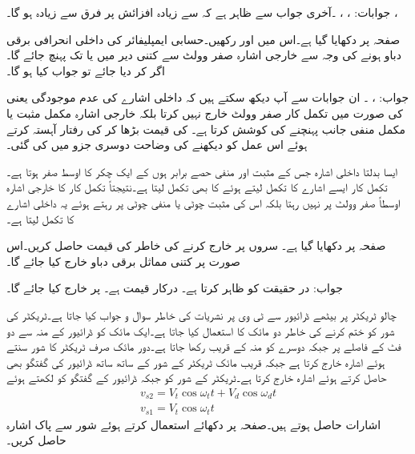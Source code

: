 جوابات: ،  ، ۔آخری جواب سے ظاہر ہے کہ  سے زیادہ افزائش پر فرق  سے زیادہ ہو گا۔ ، 

صفحہ  پر  دکھایا گیا ہے۔اس میں  اور  رکھیں۔حسابی ایمپلیفائر کی داخلی انحرافی برقی دباو  ہونے کی وجہ سے خارجی اشارہ صفر وولٹ سے کتنی دیر میں  یا  تک پہنچ جائے گا۔اگر   کر دیا جائے تو جواب کیا ہو گا۔

جواب: ،  ۔ ان جوابات سے آپ دیکھ سکتے ہیں کہ داخلی اشارے کی عدم موجودگی یعنی   کی صورت میں تکمل کار صفر وولٹ خارج نہیں کرتا بلکہ خارجی اشارہ مکمل مثبت یا مکمل منفی جانب پہنچنے کی کوشش کرتا ہے۔ کی قیمت بڑھا کر   کی رفتار آہستہ کرتے ہوئے اس عمل کو دیکھنے کی وضاحت دوسری جزو میں کی گئی۔

ایسا بدلتا داخلی اشارہ جس کے مثبت اور منفی حصے  برابر ہوں کے ایک چکر کا اوسط صفر ہوتا ہے۔تکمل کار ایسے اشارے کا تکمل لیتے ہوئے  کا بھی تکمل لیتا ہے۔نتیجتاً تکمل کار کا خارجی اشارہ اوسطاً صفر وولٹ پر نہیں رہتا بلکہ اس کی مثبت چوٹی  یا منفی چوٹی  پر رہتے ہوئے یہ داخلی اشارے کا تکمل لیتا ہے۔

صفحہ  پر  دکھایا گیا ہے۔ سروں  پر  خارج کرنے کی خاطر  کی قیمت حاصل کریں۔اس صورت   پر کتنی مماثل برقی دباو خارج کیا جائے گا۔

جواب: در حقیقت  کو ظاہر کرتا ہے۔  درکار قیمت ہے۔ پر  خارج کیا جائے گا۔

 
چالو ٹریکٹر پر بیٹھے ڈرائیور سے  ٹی وی پر نشریات کی خاطر سوال و جواب کیا جاتا ہے۔ٹریکٹر کی شور کو ختم کرنے کی خاطر دو مائک کا استعمال کیا جاتا ہے۔ایک مائک کو ڈرائیور کے منہ سے دو فٹ کے فاصلے پر جبکہ دوسرے کو منہ کے قریب رکھا جاتا ہے۔دور مائک صرف ٹریکٹر کا شور سنتے ہوئے  اشارہ خارج کرتا ہے جبکہ قریب مائک ٹریکٹر کے شور کے ساتھ ساتھ ڈرائیور کی گفتگو بھی حاصل کرتے ہوئے اشارہ  خارج کرتا ہے۔ٹریکٹر کے شور کو  جبکہ ڈرائیور کے گفتگو کو  لکھتے ہوئے
\begin{align*}
v_{s2}=V_t \cos \omega_t t +V_d \cos \omega_d t\\
v_{s1}=V_t \cos \omega_t t
\end{align*} 
اشارات حاصل ہوتے ہیں۔صفحہ  پر دکھائے  استعمال کرتے ہوئے شور سے پاک اشارہ حاصل کریں۔

